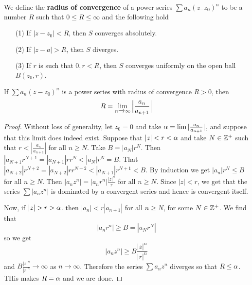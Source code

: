 \begin{definition}
    We define the \textbf{radius of convergence} of a power series
    $\sum{a_n(z_-z_0)^n}$ to be a number $R$ such that  $0 \leq R \leq \infty$
    and the following hold
    \begin{enumerate}
        \item[(1)] If $|z-z_0|<R$, then $S$ converges absolutely.

        \item[(2)] If $|z-a|>R$, then  $S$ diverges.

        \item[(3)] If $r$ is such that $0,r<R$, then  $S$ converges uniformly on
            the open ball $B(z_0,r)$.
    \end{enumerate}
\end{definition}

\begin{lemma}\label{3.1.3}
    If $\sum{a_n(z-z_0)^n}$ is a power series with radius of convergence $R>0$,
    then
    \begin{equation*}
        R=\lim_{n \xrightarrow{} \infty}\Big{|} \frac{a_n}{a_{n+1}} \Big{|}
    \end{equation*}
\end{lemma}
\begin{proof}
    Without loss of generality, let $z_0=0$ and take
    $\alpha=\lim{|\frac{a_n}{a_{n+1}}|}$, and suppose that this limit does indeed
    exist. Suppose that $|z|<r<\alpha$ and take  $N \in \mathbb{Z}^+$ such that
    $r<|\frac{a_n}{a_{n+1}}|$ for all $n \geq N$. Take  $B=|a_N|r^N$. Then
    $|a_{N+1}r^{N+1}=|a_{N+1}|rr^N<|a_N|r^N=B$. That
    $|a_{N+2}|r^{N+2}=|a_{N+2}|rr^{N+2}<|a_{N+1}|r^{N+1}<B$. By induction we get
    $|a_n|r^N \leq B$ for all  $n \geq N$. Then
    $|a_nz^n|=|a_nr^n|\frac{|z|^n}{r}$ for all $n \geq N$. Since  $|z|<r$, we
    get that the series  $\sum{|a_nz^n|}$ is dominated by a convergent series
    and hence is convergent itself.

    Now, if $|z|>r>\a$. then $|a_n|<r|
    a_{n+1}|$ for all $n \geq N$, for some  $N \in \mathbb{Z}^+$. We find that
    \begin{equation*}
        |a_nr^n| \geq B=|a_Nr^N|
    \end{equation*}
    so we get
    \begin{equation*}
        |a_nz^n| \geq B\frac{|z|^n}{|r|^n}
    \end{equation*}
    and $B\frac{|z|^n}{|r|^n} \xrightarrow{} \infty$ as $n \xrightarrow{}
    \infty$. Therefore the series $\sum{a_nz^n}$ diverges so that $R \leq \alpha$.
    THis makes  $R=\alpha$ and we are done.
\end{proof}

